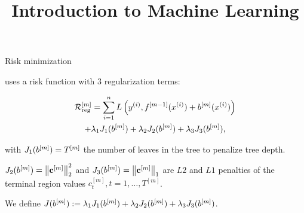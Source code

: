 





\newcommand{\learninggoals}{
  \item \textcolor{blue}{XXX}
  \item \textcolor{blue}{XXX}
}

\title{Introduction to Machine Learning}
\date{}




\begin{vbframe}{Risk minimization}

     uses a risk function with 3 regularization terms:

    \begin{multline*}
      \mathcal{R}_{\text{reg}}^{[m]} = \sum_{i=1}^{n} L\left(y^{(i)}, f^{[m-1]}(x^{(i)}) + b^{[m]}(x^{(i)})\right)\\
       + \lambda_1 J_1(b^{[m]}) + \lambda_2 J_2(b^{[m]}) + \lambda_3 J_3(b^{[m]}),
    \end{multline*}

    \lz

    with $J_1(b^{[m]}) = T^{[m]}$ the number of leaves in the tree to penalize tree depth.

    \lz

    $J_2(b^{[m]}) = \left\|\mathbf{c}^{[m]}\right\|^2_2$ and $J_3(b^{[m]}) = \left\|\mathbf{c}^{[m]}\right\|_1$ are $L2$ and $L1$ penalties of the terminal region values $c_t^{[m]}, t=1,\dots,T^{[m]}$.

    \lz

    We define $J(b^{[m]}) := \lambda_1 J_1(b^{[m]}) + \lambda_2 J_2(b^{[m]}) + \lambda_3 J_3(b^{[m]})$.

    \framebreak







\end{vbframe}
